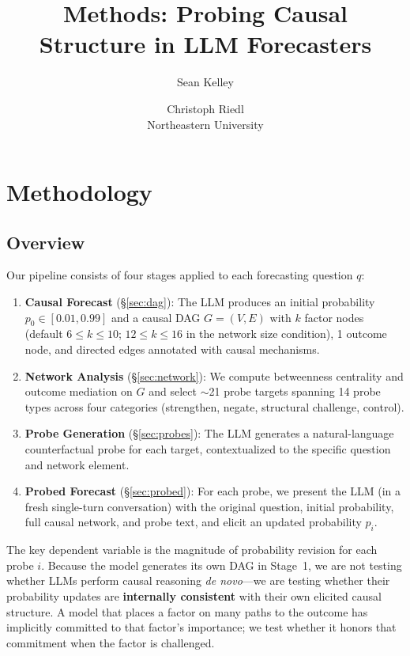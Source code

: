 \documentclass[11pt]{article}
\title{Methods: Probing Causal Structure in LLM Forecasters}
\author{
  Sean Kelley \and Christoph Riedl \\
  Northeastern University
}
\begin{document}
\maketitle

\section{Methodology}
\label{sec:method}

\subsection{Overview}

Our pipeline consists of four stages applied to each forecasting question $q$:

\begin{enumerate}
    \item \textbf{Causal Forecast} (\S\ref{sec:dag}): The LLM produces an initial probability $p_0 \in [0.01, 0.99]$ and a causal DAG $G = (V, E)$ with $k$ factor nodes (default $6 \leq k \leq 10$; $12 \leq k \leq 16$ in the network size condition), 1 outcome node, and directed edges annotated with causal mechanisms.
    \item \textbf{Network Analysis} (\S\ref{sec:network}): We compute betweenness centrality and outcome mediation on $G$ and select ${\sim}$21 probe targets spanning 14 probe types across four categories (strengthen, negate, structural challenge, control).
    \item \textbf{Probe Generation} (\S\ref{sec:probes}): The LLM generates a natural-language counterfactual probe for each target, contextualized to the specific question and network element.
    \item \textbf{Probed Forecast} (\S\ref{sec:probed}): For each probe, we present the LLM (in a fresh single-turn conversation) with the original question, initial probability, full causal network, and probe text, and elicit an updated probability $p_i$.
\end{enumerate}

The key dependent variable is the magnitude of probability revision for each probe $i$. Because the model generates its own DAG in Stage~1, we are not testing whether LLMs perform causal reasoning \emph{de novo}---we are testing whether their probability updates are \textbf{internally consistent} with their own elicited causal structure. A model that places a factor on many paths to the outcome has implicitly committed to that factor's importance; we test whether it honors that commitment when the factor is challenged.
\end{document}
